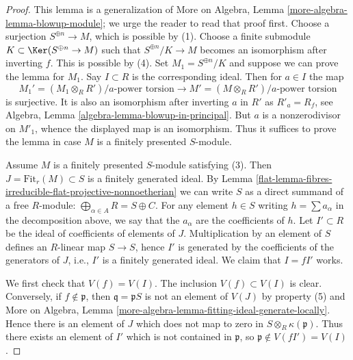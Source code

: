 \begin{proof}

This lemma is a generalization of
More on Algebra, Lemma \ref{more-algebra-lemma-blowup-module};
we urge the reader to read that proof first.
Choose a surjection $S^{\oplus n} \to M$, which is possible by (1).
Choose a finite submodule $K \subset \Ker(S^{\oplus n} \to M)$
such that $S^{\oplus n}/K \to M$ becomes an isomorphism after inverting $f$.
This is possible by (4). Set $M_1 = S^{\oplus n}/K$ and suppose we can
prove the lemma for $M_1$. Say $I \subset R$ is the corresponding ideal.
Then for $a \in I$ the map
$$
M_1' = (M_1 \otimes_R R')/a\text{-power torsion}
\longrightarrow
M' = (M \otimes_R R')/a\text{-power torsion}
$$
is surjective. It is also an isomorphism after inverting $a$ in $R'$
as $R'_a = R_f$, see Algebra, Lemma \ref{algebra-lemma-blowup-in-principal}.
But $a$ is a nonzerodivisor on $M'_1$, whence the displayed map is an
isomorphism. Thus it suffices to prove the lemma in case $M$ is a finitely
presented $S$-module.

\medskip\noindent
Assume $M$ is a finitely presented $S$-module satisfying (3).
Then $J = \text{Fit}_r(M) \subset S$ is a finitely generated ideal.
By Lemma \ref{flat-lemma-fibres-irreducible-flat-projective-nonnoetherian}
we can write $S$ as a direct summand of a free
$R$-module: $\bigoplus_{\alpha \in A} R = S \oplus C$.
For any element $h \in S$ writing $h = \sum a_\alpha$ in the
decomposition above, we say that the $a_\alpha$ are the coefficients of $h$.
Let $I' \subset R$ be the ideal of coefficients
of elements of $J$. Multiplication by an element of $S$ defines
an $R$-linear map $S \to S$, hence $I'$ is generated by the coefficients
of the generators of $J$, i.e., $I'$ is a finitely generated ideal.
We claim that $I = fI'$ works.

\medskip\noindent
We first check that $V(f) = V(I)$. The inclusion $V(f) \subset V(I)$ is
clear. Conversely, if $f \not \in \mathfrak p$, then
$\mathfrak q =  \mathfrak p S$ is not an element of $V(J)$ by
property (5) and More on Algebra, Lemma
\ref{more-algebra-lemma-fitting-ideal-generate-locally}.
Hence there is an
element of $J$ which does not map to zero in $S \otimes_R \kappa(\mathfrak p)$.
Thus there exists an element of $I'$ which is not contained in
$\mathfrak p$, so $\mathfrak p \not \in V(fI') = V(I)$.


\end{proof}
